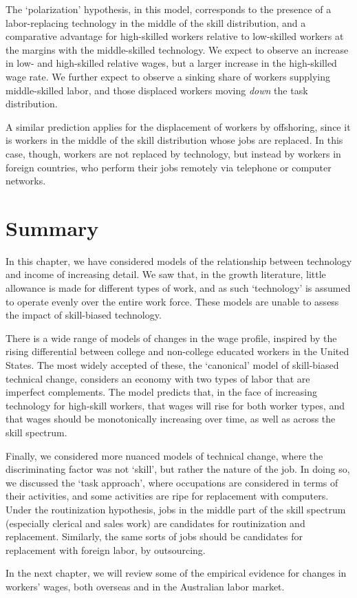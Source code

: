 The `polarization' hypothesis, in this model, corresponds to the presence of a labor-replacing technology in the middle of the skill distribution, and a comparative advantage for high-skilled workers relative to low-skilled workers at the margins with the middle-skilled technology. We expect to observe an increase in low- and high-skilled relative wages, but a larger increase in the high-skilled wage rate. We further expect to observe a sinking share of workers supplying middle-skilled labor, and those displaced workers moving {\em down} the task distribution.

A similar prediction applies for the displacement of workers by offshoring, since it is workers in the middle of the skill distribution whose jobs are replaced. In this case, though, workers are not replaced by technology, but instead by workers in foreign countries, who perform their jobs remotely via telephone or computer networks.

\section{Summary}

In this chapter, we have considered models of the relationship between technology and income of increasing detail. We saw that, in the growth literature, little allowance is made for different types of work, and as such `technology' is assumed to operate evenly over the entire work force. These models are unable to assess the impact of skill-biased technology.

There is a wide range of models of changes in the wage profile, inspired by the rising differential between college and non-college educated workers in the United States. The most widely accepted of these, the `canonical' model of skill-biased technical change, considers an economy with two types of labor that are imperfect complements. The model predicts that, in the face of increasing technology for high-skill workers, that wages will rise for both worker types, and that wages should be monotonically increasing over time, as well as across the skill spectrum.

Finally, we considered more nuanced models of technical change, where the discriminating factor was not `skill', but rather the nature of the job. In doing so, we discussed the `task approach', where occupations are considered in terms of their activities, and some activities are ripe for replacement with computers. Under the routinization hypothesis, jobs in the middle part of the skill spectrum (especially clerical and sales work) are candidates for routinization and replacement. Similarly, the same sorts of jobs should be candidates for replacement with foreign labor, by outsourcing.

In the next chapter, we will review some of the empirical evidence for changes in workers' wages, both overseas and in the Australian labor market.

